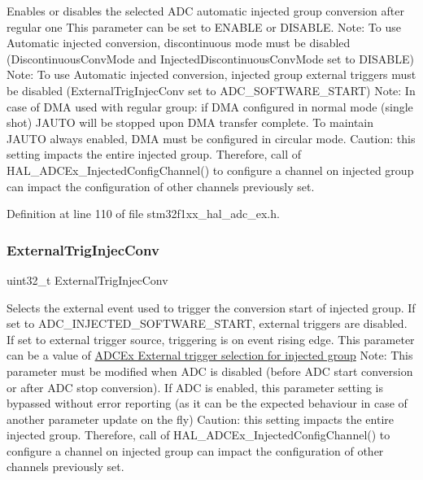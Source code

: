 Enables or disables the selected A\+DC automatic injected group conversion after regular one This parameter can be set to E\+N\+A\+B\+LE or D\+I\+S\+A\+B\+LE. Note\+: To use Automatic injected conversion, discontinuous mode must be disabled (\textquotesingle{}Discontinuous\+Conv\+Mode\textquotesingle{} and \textquotesingle{}Injected\+Discontinuous\+Conv\+Mode\textquotesingle{} set to D\+I\+S\+A\+B\+LE) Note\+: To use Automatic injected conversion, injected group external triggers must be disabled (\textquotesingle{}External\+Trig\+Injec\+Conv\textquotesingle{} set to A\+D\+C\+\_\+\+S\+O\+F\+T\+W\+A\+R\+E\+\_\+\+S\+T\+A\+RT) Note\+: In case of D\+MA used with regular group\+: if D\+MA configured in normal mode (single shot) J\+A\+U\+TO will be stopped upon D\+MA transfer complete. To maintain J\+A\+U\+TO always enabled, D\+MA must be configured in circular mode. Caution\+: this setting impacts the entire injected group. Therefore, call of H\+A\+L\+\_\+\+A\+D\+C\+Ex\+\_\+\+Injected\+Config\+Channel() to configure a channel on injected group can impact the configuration of other channels previously set. 

Definition at line 110 of file stm32f1xx\+\_\+hal\+\_\+adc\+\_\+ex.\+h.

\mbox{\label{struct_a_d_c___injection_conf_type_def_a4e7ca27dcc31a41f231b3780ce1cb824}} 
\subsubsection{\texorpdfstring{External\+Trig\+Injec\+Conv}{ExternalTrigInjecConv}}
{\footnotesize\ttfamily uint32\+\_\+t External\+Trig\+Injec\+Conv}

Selects the external event used to trigger the conversion start of injected group. If set to A\+D\+C\+\_\+\+I\+N\+J\+E\+C\+T\+E\+D\+\_\+\+S\+O\+F\+T\+W\+A\+R\+E\+\_\+\+S\+T\+A\+RT, external triggers are disabled. If set to external trigger source, triggering is on event rising edge. This parameter can be a value of \hyperlink{group___a_d_c_ex___external__trigger__source___injected}{A\+D\+C\+Ex External trigger selection for injected group} Note\+: This parameter must be modified when A\+DC is disabled (before A\+DC start conversion or after A\+DC stop conversion). If A\+DC is enabled, this parameter setting is bypassed without error reporting (as it can be the expected behaviour in case of another parameter update on the fly) Caution\+: this setting impacts the entire injected group. Therefore, call of H\+A\+L\+\_\+\+A\+D\+C\+Ex\+\_\+\+Injected\+Config\+Channel() to configure a channel on injected group can impact the configuration of other channels previously set. 

